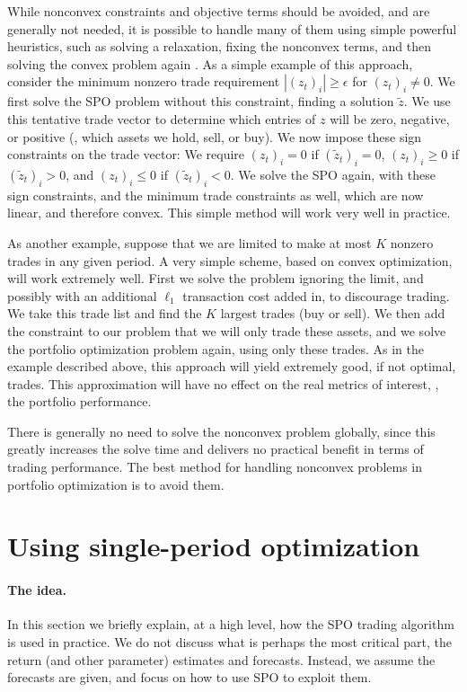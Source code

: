 \documentclass[openany]{now}
\begin{document}
While nonconvex constraints and objective terms should be avoided, and
are generally not needed,
it is possible to handle many of them using simple powerful heuristics,
such as solving a relaxation, fixing the nonconvex terms, and then solving
the convex problem again \cite{diamondtakapoui2016}.
As a simple example of this approach,
consider the minimum nonzero trade requirement
$|(z_t)_i| \geq \epsilon$ for $(z_t)_i \neq 0$.
We first solve the SPO problem without this constraint, finding a solution
$\tilde z$. We use this tentative trade vector to determine
which entries of $z$ will be zero, negative, or positive (\ie, which assets
we hold, sell, or buy).  We now impose these
sign constraints on the trade vector:
We require $(z_t)_i=0$ if $(\tilde z_t)_i=0$,
$(z_t)_i\geq 0$ if $(\tilde z_t)_i>0$,
and $(z_t)_i\leq 0$ if $(\tilde z_t)_i<0$.
We solve the SPO again, with these sign
constraints, and the minimum trade constraints as well, which are now
linear, and therefore convex.  This simple method will work very well in
practice.

As another example, suppose that we are limited to make at most $K$ nonzero trades
in any given period.
A very simple scheme, based on convex optimization,  will work extremely well.
First we solve the problem ignoring the limit, and possibly with an additional
$\ell_1$ transaction cost added in, to discourage trading.  We take this trade list
and find the $K$ largest trades (buy or sell).  We then add the constraint to
our problem that we will only trade these assets, and we solve the
portfolio optimization problem again, using only these trades.
As in the example described above, this approach will yield extremely good, if not
optimal, trades.  This approximation will have no effect on the
real metrics of interest, \ie, the portfolio performance.

There is generally no need to solve the nonconvex problem
globally, since this greatly increases the solve time and delivers no
practical benefit in terms of trading performance.
The best method for handling nonconvex problems in portfolio optimization
is to avoid them.

\section{Using single-period optimization}
\label{subsec:using-spo}

\paragraph{The idea.}
In this section we briefly explain, at a high level, how the SPO trading
algorithm is used in practice.
We do not discuss what is perhaps the most critical part,
the return (and other parameter) estimates and forecasts.
Instead, we assume the forecasts are given, and focus on how to use SPO to
exploit them.
\end{document}
